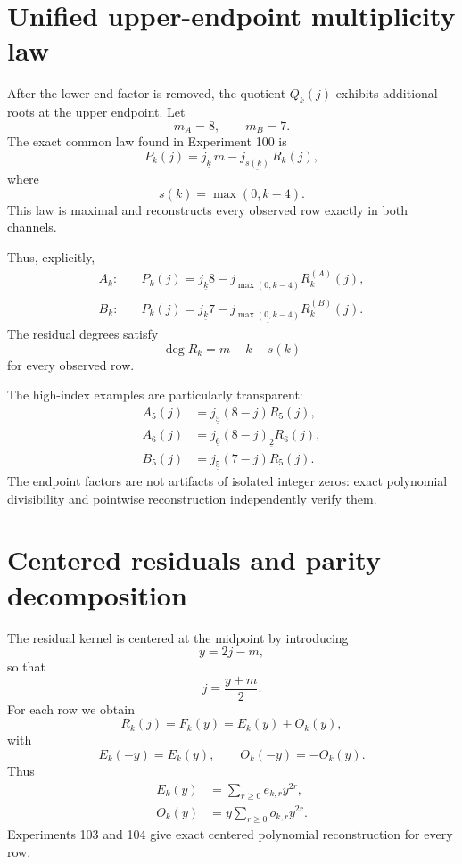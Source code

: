 \documentclass[11pt,a4paper]{article}
\newcommand{\fall}[2]{#1_{\underline{#2}}}
\begin{document}
\section{Unified upper-endpoint multiplicity law}

After the lower-end factor is removed, the quotient $Q_k(j)$ exhibits additional roots at the upper endpoint.  Let
\[
m_A=8,\qquad m_B=7.
\]
The exact common law found in Experiment 100 is
\begin{equation}
\label{eq:twosided}
P_k(j)=\fall{j}{k}\,\fall{m-j}{s(k)}\,R_k(j),
\end{equation}
where
\begin{equation}
\label{eq:sk}
s(k)=\max(0,k-4).
\end{equation}
This law is maximal and reconstructs every observed row exactly in both channels.

Thus, explicitly,
\begin{align*}
A_k:\quad&P_k(j)=\fall{j}{k}\fall{8-j}{\max(0,k-4)}R^{(A)}_k(j),\\
B_k:\quad&P_k(j)=\fall{j}{k}\fall{7-j}{\max(0,k-4)}R^{(B)}_k(j).
\end{align*}
The residual degrees satisfy
\[
\deg R_k=m-k-s(k)
\]
for every observed row.

The high-index examples are particularly transparent:
\begin{align*}
A_5(j)&=\fall{j}{5}(8-j)R_5(j),\\
A_6(j)&=\fall{j}{6}(8-j)_{\underline 2}R_6(j),\\
B_5(j)&=\fall{j}{5}(7-j)R_5(j).
\end{align*}
The endpoint factors are not artifacts of isolated integer zeros: exact polynomial divisibility and pointwise reconstruction independently verify them.

\section{Centered residuals and parity decomposition}

The residual kernel is centered at the midpoint by introducing
\[
y=2j-m,
\]
so that
\[
j=\frac{y+m}{2}.
\]
For each row we obtain
\begin{equation}
R_k(j)=F_k(y)=E_k(y)+O_k(y),
\end{equation}
with
\[
E_k(-y)=E_k(y),\qquad O_k(-y)=-O_k(y).
\]
Thus
\begin{align*}
E_k(y)&=\sum_{r\ge0} e_{k,r}y^{2r},\\
O_k(y)&=y\sum_{r\ge0} o_{k,r}y^{2r}.
\end{align*}
Experiments 103 and 104 give exact centered polynomial reconstruction for every row.
\end{document}
